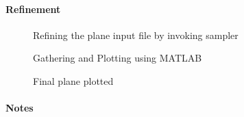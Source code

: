\paragraph{Refinement}

	\begin{figure}[H]\centering
	    \caption{Refining the plane input file by invoking sampler}
	\end{figure}

	\begin{figure}[H]\centering
	    \caption{Gathering and Plotting using MATLAB}
	\end{figure}

	\begin{figure}[H]\centering
	    \caption{Final plane plotted}
	\end{figure}

\paragraph{Notes}



